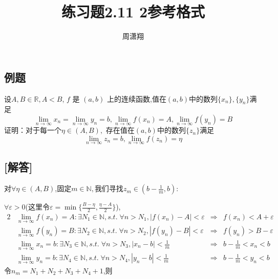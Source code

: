 \documentclass{ctexart}
\begin{document}
	
	\title{练习题2.11 2参考格式} %
	
	\author{周潇翔} %
	
	
	
	\maketitle %
	
	
	
	
\subsection*{例题}
		
		设$A,B \in \mathbb{R},A<B$, $f$ 是 $(a,b)$ 上的连续函数,值在$(a,b)$中的数列$\{x_n\},\{y_n\}$满足
		$$\lim\limits_{n\rightarrow \infty}x_n=\lim\limits_{n\rightarrow \infty}y_n=b,\lim\limits_{n\rightarrow \infty}f(x_n)=A,\lim\limits_{n\rightarrow \infty}f(y_n)=B$$
		证明：对于每一个$\eta \in (A,B),$ 存在值在$(a,b)$中的数列$\{z_n\}$满足
		$$\lim\limits_{n\rightarrow \infty}z_n=b,\lim\limits_{n\rightarrow \infty}f(z_n)=\eta$$
\subsection*{[解答]}
		对$\forall \eta \in (A,B)$,固定$m \in \mathbb{N},$我们寻找$\displaystyle z_m \in (b- \frac{1}{m},b)$:
		
		$\forall \varepsilon>0$(这里令$\displaystyle \varepsilon = \min \{ \frac{B-\eta}{2},\frac{\eta-A}{2}\}$),
\begin{alignat*}{2}
			&\lim\limits_{n\rightarrow \infty}f(x_n)=A \colon \exists N_1 \in \mathbb{N}, s.t.\; \forall n>N_1, |f(x_n)-A|< \varepsilon & \Rightarrow &  f(x_n)< A+ \varepsilon\\
	&\lim\limits_{n\rightarrow \infty}f(y_n)=B \colon \exists N_2 \in \mathbb{N}, s.t.\; \forall n>N_2, |f(y_n)-B|< \varepsilon & \Rightarrow &  f(y_n)> B- \varepsilon		\\
	&\lim\limits_{n\rightarrow \infty}x_n=b \colon \exists N_3 \in \mathbb{N}, s.t.\; \forall n>N_3, |x_n-b|< \frac{1}{m} & \Rightarrow &  b-\frac{1}{m}<x_n< b		\\
	&\lim\limits_{n\rightarrow \infty}y_n=b \colon \exists N_4 \in \mathbb{N}, s.t.\; \forall n>N_4, |y_n-b|< \frac{1}{m} & \Rightarrow &  b-\frac{1}{m}<y_n< b
\end{alignat*}
令$n_m=N_1+N_2+N_3+N_4+1$,则
	
\end{document}
